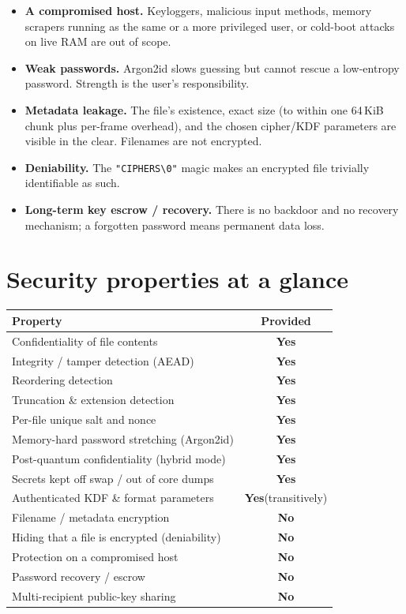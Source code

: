 \documentclass[11pt,a4paper]{article}
\newcommand{\yes}{\textcolor{good}{\textbf{Yes}}}
\newcommand{\no}{\textcolor{warn}{\textbf{No}}}
\newcommand{\code}[1]{\texttt{#1}}
\begin{document}
\begin{itemize}[leftmargin=1.4em]
  \item \textbf{A compromised host.} Keyloggers, malicious input methods,
        memory scrapers running as the same or a more privileged user, or
        cold-boot attacks on live RAM are out of scope.
  \item \textbf{Weak passwords.} Argon2id slows guessing but cannot rescue a
        low-entropy password. Strength is the user's responsibility.
  \item \textbf{Metadata leakage.} The file's existence, exact size
        (to within one 64\,KiB chunk plus per-frame overhead), and the chosen
        cipher/KDF parameters are visible in the clear. Filenames are not
        encrypted.
  \item \textbf{Deniability.} The \code{"CIPHERS\textbackslash0"} magic makes
        an encrypted file trivially identifiable as such.
  \item \textbf{Long-term key escrow / recovery.} There is no backdoor and no
        recovery mechanism; a forgotten password means permanent data loss.
\end{itemize}

\section{Security properties at a glance}

\begin{center}
\begin{longtable}{@{}p{}c@{}}
\toprule
\textbf{Property} & \textbf{Provided}\\
\midrule
\endhead
Confidentiality of file contents              & \yes\\
Integrity / tamper detection (AEAD)           & \yes\\
Reordering detection                          & \yes\\
Truncation \& extension detection             & \yes\\
Per-file unique salt and nonce                & \yes\\
Memory-hard password stretching (Argon2id)    & \yes\\
Post-quantum confidentiality (hybrid mode)    & \yes\\
Secrets kept off swap / out of core dumps     & \yes\\
Authenticated KDF \& format parameters        & \yes (transitively)\\
\midrule
Filename / metadata encryption                & \no\\
Hiding that a file is encrypted (deniability) & \no\\
Protection on a compromised host              & \no\\
Password recovery / escrow                    & \no\\
Multi-recipient public-key sharing            & \no\\
\bottomrule
\end{longtable}
\end{center}
\end{document}
